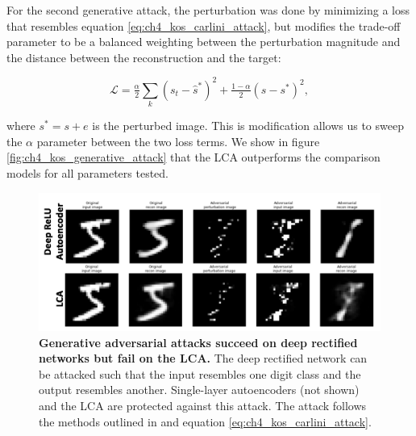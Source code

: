 For the second generative attack, the perturbation was done by minimizing a loss that resembles equation \eqref{eq:ch4_kos_carlini_attack}, but modifies the trade-off parameter to be a balanced weighting between the perturbation magnitude and the distance between the reconstruction and the target:

\begin{equation}\label{eq:ch4_carlini_targeted_recon}
    \mathcal{L} = \tfrac{\alpha}{2} \sum_{k}\left(s_{t} - \hat{s}^{*}\right)^{2} + \tfrac{1-\alpha}{2}\left(s - s^{*}\right)^{2},
\end{equation}

\noindent where $s^{*}=s+e$ is the perturbed image. This is modification allows us to sweep the $\alpha$ parameter between the two loss terms. We show in figure \ref{fig:ch4_kos_generative_attack} that the LCA outperforms the comparison models for all parameters tested.

\begin{figure}[h]
    \centering
    \includegraphics[width=\textwidth]{figures/adv_carlini_deep_relu_lca.png}
    \caption{\textbf{Generative adversarial attacks succeed on deep rectified networks but fail on the LCA.} The deep rectified network can be attacked such that the input resembles one digit class and the output resembles another. Single-layer autoencoders (not shown) and the LCA are protected against this attack. The attack follows the methods outlined in \parencite{kos2018adversarial} and equation \eqref{eq:ch4_kos_carlini_attack}.}
    \label{fig:ch4_carlini_deep_relu_lca}
\end{figure}



